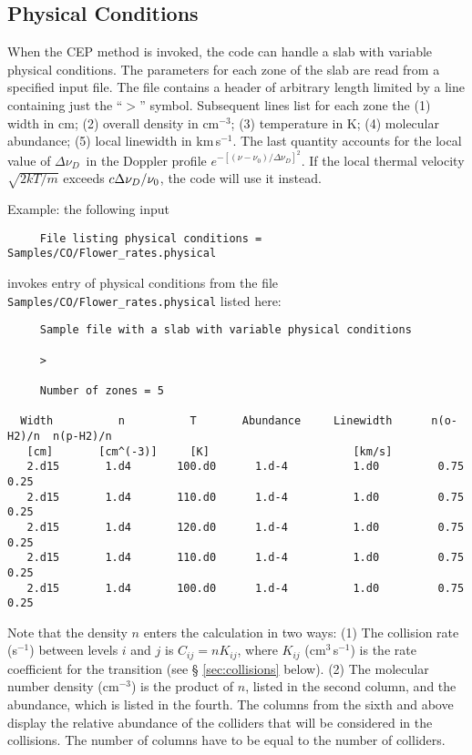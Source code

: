 \documentclass[12pt]{article}
\def\DnuD     {\hbox{$\Delta\nu_D$}}
\begin{document}
\subsection{Physical Conditions}
\label{sec:physical}

When the CEP method is invoked, the code can handle a slab with variable
physical conditions. The parameters for each zone of the slab are read from a
specified input file. The file contains a header of arbitrary length limited by
a line containing just the ``\texttt{$>$}'' symbol. Subsequent lines list for
each zone the (1) width in cm; (2) overall density in cm$^{-3}$; (3)
temperature in K; (4) molecular abundance; (5) local linewidth in km\,s$^{-1}$.
The last quantity accounts for the local value of \DnuD\ in the Doppler profile
$e^{-[(\nu - \nu_0)/\Delta \nu_D]^2}$. If the local thermal velocity
$\sqrt{2kT/m}$ exceeds $c\DnuD/\nu_0$, the code will use it instead.

Example: the following input
%
\smallskip
\begin{verbatim}
     File listing physical conditions = Samples/CO/Flower_rates.physical
\end{verbatim}
invokes entry of physical conditions from the file
\texttt{Samples/CO/Flower\_rates.physical} listed here:
\begin{verbatim}
     Sample file with a slab with variable physical conditions

     >

     Number of zones = 5

  Width          n          T       Abundance     Linewidth      n(o-H2)/n  n(p-H2)/n
   [cm]       [cm^(-3)]     [K]                      [km/s]
   2.d15       1.d4       100.d0      1.d-4          1.d0         0.75       0.25
   2.d15       1.d4       110.d0      1.d-4          1.d0         0.75       0.25
   2.d15       1.d4       120.d0      1.d-4          1.d0         0.75       0.25
   2.d15       1.d4       110.d0      1.d-4          1.d0         0.75       0.25
   2.d15       1.d4       100.d0      1.d-4          1.d0         0.75       0.25
\end{verbatim}
Note that the density $n$ enters the calculation in two ways: (1) The collision
rate (s$^{-1}$) between levels $i$ and $j$ is $C_{ij} = nK_{ij}$, where
$K_{ij}$ (cm$^3$\,s$^{-1}$) is the rate coefficient for the transition (see \S
\ref{sec:collisions} below). (2) The molecular number density (cm$^{-3}$) is
the product of $n$, listed in the second column, and the abundance, which is
listed in the fourth. The columns from the sixth and above display the relative abundance
of the colliders that will be considered in the collisions. The number of columns
have to be equal to the number of colliders.
\end{document}
